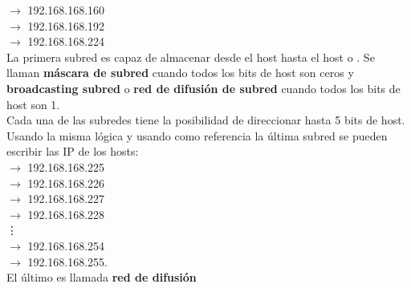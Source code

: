 \documentclass[
	12pt, %
	fleqn, %
	a4paper, %
	oneside, %
]{LegrandOrangeBook}
\begin{document}
$\rightarrow$ 192.168.168.160\\
$\rightarrow$ 192.168.168.192\\
$\rightarrow$ 192.168.168.224\\
La primera subred es capaz de almacenar desde el host  hasta el host  o . Se llaman \textbf{máscara de subred} cuando todos los bits de host son ceros y \textbf{broadcasting subred} o \textbf{red de difusión de subred} cuando todos los bits de host son 1.\\
Cada una de las subredes tiene la posibilidad de direccionar hasta 5 bits de host. Usando la misma lógica y usando como referencia la última subred  se pueden escribir las IP de los hosts:\\
$\rightarrow$ 192.168.168.225\\
$\rightarrow$ 192.168.168.226\\
$\rightarrow$ 192.168.168.227\\
$\rightarrow$ 192.168.168.228\\
\vdots\\
$\rightarrow$ 192.168.168.254\\
$\rightarrow$ 192.168.168.255.\\
El último es llamada \textbf{red de difusión}
\end{document}

